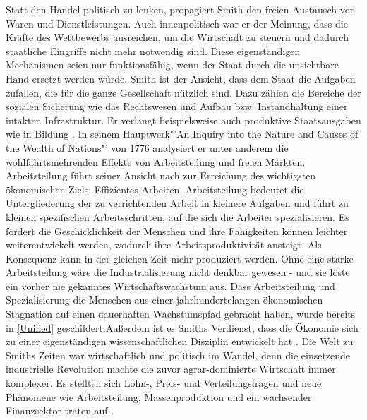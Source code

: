 Statt den Handel politisch zu lenken, propagiert Smith den freien Austausch von Waren und Dienstleistungen. Auch innenpolitisch war er der Meinung, dass die Kr{\"a}fte des Wettbewerbs ausreichen, um die Wirtschaft zu steuern und dadurch staatliche Eingriffe nicht mehr notwendig sind. Diese eigenst{\"a}ndigen Mechanismen seien nur funktionsf{\"a}hig, wenn der Staat durch die unsichtbare Hand ersetzt werden w{\"u}rde. \newline Smith ist der Ansicht, dass dem Staat die Aufgaben zufallen, die f{\"u}r die ganze Gesellschaft n{\"u}tzlich sind. Dazu z{\"a}hlen die Bereiche der sozialen Sicherung wie das Rechtswesen und Aufbau bzw. Instandhaltung einer intakten Infrastruktur. Er verlangt beispielsweise auch produktive Staatsausgaben wie in Bildung \citep{Huther.2006}. \newline In seinem Hauptwerk"'An Inquiry into the Nature and Causes of the Wealth of Nations"' von 1776 analysiert er unter anderem die wohlfahrtsmehrenden Effekte von Arbeitsteilung und freien M{\"a}rkten. Arbeitsteilung f{\"u}hrt seiner Ansicht nach zur Erreichung des wichtig\-sten {\"o}konomischen Ziels: Effizientes Arbeiten. Arbeitsteilung bedeutet die Untergliederung der zu verrichtenden Arbeit in kleinere Aufgaben und f{\"u}hrt zu kleinen spezifischen Arbeitsschritten, auf die sich die Arbeiter spezialisieren. Es f{\"o}rdert die Geschicklichkeit der Menschen und ihre F{\"a}higkeiten k{\"o}nnen leichter weiterentwickelt werden, wodurch ihre Arbeitsproduktivit{\"a}t ansteigt. Als Konsequenz kann in der gleichen Zeit mehr produziert werden. Ohne eine starke Arbeitsteilung w{\"a}re die Industrialisierung nicht denkbar gewesen - und sie l{\"o}ste ein vorher nie gekanntes Wirtschaftswachstum aus. Dass Arbeitsteilung und Spezialisierung die Menschen aus einer jahrhundertelangen {\"o}konomischen Stagnation auf einen dauerhaften Wachstumspfad gebracht haben, wurde bereits in \ref{Unified} geschildert.\newline Au{\ss}erdem ist es Smiths Verdienst, dass die {\"O}konomie sich zu einer eigenst{\"a}ndigen wissenschaftlichen Disziplin entwickelt hat \citep{Lin.2007,Huther.2006}. \newline Die Welt zu Smiths Zeiten war wirtschaftlich und politisch im Wandel, denn die einsetzende industrielle Revolution machte die zuvor agrar-dominierte Wirtschaft immer komplexer. Es stellten sich Lohn-, Preis- und Verteilungsfragen und neue Ph{\"a}nomene wie Arbeitsteilung, Massenproduktion und ein wachsender Finanzsektor traten auf \citep{Lin.2007}.
